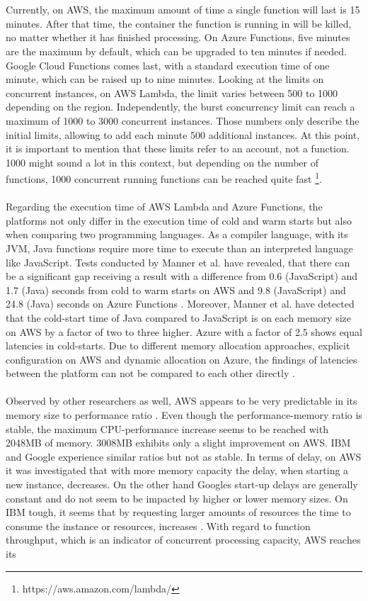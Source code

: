 \documentclass[a4paper,11pt, pagesize]{scrartcl}
\begin{document}
\begin{spacing}{1.2}
\\\\ Currently, on AWS, the maximum amount of time a single function will last is 15 minutes. After that time, the container the function is running in will be killed, no matter whether it has finished processing. On Azure Functions, five minutes are the maximum by default, which can be upgraded to ten minutes if needed. Google Cloud Functions comes last, with a standard execution time of one minute, which can be raised up to nine minutes. Looking at the limits on concurrent instances, on AWS Lambda, the limit varies between 500 to 1000 depending on the region. Independently, the burst concurrency limit can reach a maximum of 1000 to 3000 concurrent instances. Those numbers only describe the initial limits, allowing to add each minute 500 additional instances. At this point, it is important to mention that these limits refer to an account, not a function. 1000 might sound a lot in this context, but depending on the number of functions, 1000 concurrent running functions can be reached quite fast \footnote{https://aws.amazon.com/lambda/}.\\\\ Regarding the execution time of AWS Lambda and Azure Functions, the platforms not only differ in the execution time of cold and warm starts but also when comparing two programming languages. As a compiler language, with its JVM, Java functions require more time to execute than an interpreted language like JavaScript. Tests conducted by Manner et al. have revealed, that there can be a significant gap receiving a result with a difference from 0.6 (JavaScript) and 1.7 (Java) seconds from cold to warm starts on AWS and 9.8 (JavaScript) and 24.8 (Java) seconds on Azure Functions \cite{manner2018cold}. Moreover, Manner et al. have detected that the cold-start time of Java compared to JavaScript is on each memory size on AWS by a factor of two to three higher. Azure with a factor of 2.5 shows equal latencies in cold-starts. Due to different memory allocation approaches, explicit configuration on AWS and dynamic allocation on Azure, the findings of latencies between the platform can not be compared to each other directly \cite{manner2018cold}.\\\\ Observed by other researchers as well, AWS appears to be very predictable in its memory size to performance ratio \cite{pawlik2019performance}. Even though the performance-memory ratio is stable, the maximum CPU-performance increase seems to be reached with 2048MB of memory. 3008MB exhibits only a slight improvement on AWS. IBM and Google experience similar ratios but not as stable. In terms of delay, on AWS it was investigated that with more memory capacity the delay, when starting a new instance, decreases. On the other hand Googles start-up delays are generally constant and do not seem to be impacted by higher or lower memory sizes. On IBM tough, it seems that by requesting larger amounts of resources the time to consume the instance or resources, increases \cite{pawlik2019performance}. With regard to function throughput, which is an indicator of concurrent processing capacity, AWS reaches its 
\end{spacing}
\end{document}
